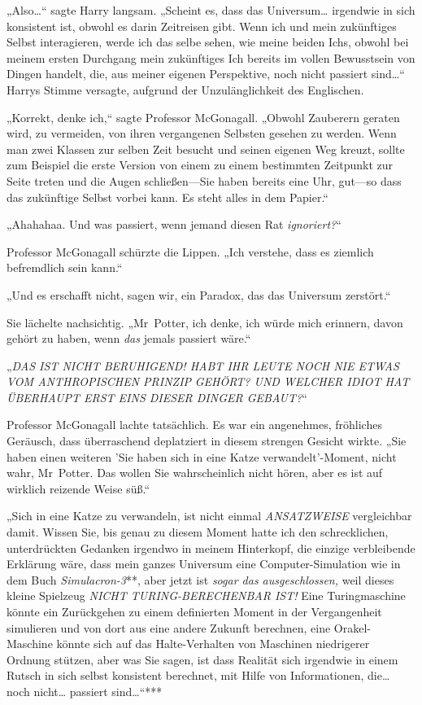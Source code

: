 {„Also…“ sagte Harry langsam. „Scheint es, dass das Universum… irgendwie in sich konsistent ist, obwohl es darin Zeitreisen gibt. Wenn ich und mein zukünftiges Selbst interagieren, werde ich das selbe sehen, wie meine beiden Ichs, obwohl bei meinem ersten Durchgang mein zukünftiges Ich bereits im vollen Bewusstsein von Dingen handelt, die, aus meiner eigenen Perspektive, noch nicht passiert sind…“ Harrys Stimme versagte, aufgrund der Unzulänglichkeit des Englischen.

„Korrekt, denke ich,“ sagte Professor McGonagall. „Obwohl Zauberern geraten wird, zu vermeiden, von ihren vergangenen Selbsten gesehen zu werden. Wenn man zwei Klassen zur selben Zeit besucht und seinen eigenen Weg kreuzt, sollte zum Beispiel die erste Version von einem zu einem bestimmten Zeitpunkt zur Seite treten und die Augen schließen—Sie haben bereits eine Uhr, gut—so dass das zukünftige Selbst vorbei kann. Es steht alles in dem Papier.“

„Ahahahaa. Und was passiert, wenn jemand diesen Rat \emph{ignoriert?}“

Professor McGonagall schürzte die Lippen. „Ich verstehe, dass es ziemlich befremdlich sein kann.“

„Und es erschafft nicht, sagen wir, ein Paradox, das das Universum zerstört.“

Sie lächelte nachsichtig. „Mr~Potter, ich denke, ich würde mich erinnern, davon gehört zu haben, wenn \emph{das} jemals passiert wäre.“

„\emph{DAS IST NICHT BERUHIGEND! HABT IHR LEUTE NOCH NIE ETWAS VOM ANTHROPISCHEN PRINZIP} \emph{GEHÖRT? UND WELCHER IDIOT HAT ÜBERHAUPT ERST EINS DIESER DINGER GEBAUT?}“

Professor McGonagall lachte tatsächlich. Es war ein angenehmes, fröhliches Geräusch, dass überraschend deplatziert in diesem strengen Gesicht wirkte. „Sie haben einen weiteren 'Sie haben sich in eine Katze verwandelt'-Moment, nicht wahr, Mr~Potter. Das wollen Sie wahrscheinlich nicht hören, aber es ist auf wirklich reizende Weise süß.“

„Sich in eine Katze zu verwandeln, ist nicht einmal \emph{ANSATZWEISE} vergleichbar damit. Wissen Sie, bis genau zu diesem Moment hatte ich den schrecklichen, unterdrückten Gedanken irgendwo in meinem Hinterkopf, die einzige verbleibende Erklärung wäre, dass mein ganzes Universum eine Computer-Simulation wie in dem Buch \emph{Simulacron-3}**, aber jetzt ist \emph{sogar das ausgeschlossen,} weil dieses kleine Spielzeug \emph{NICHT TURING-BERECHENBAR IST!} Eine Turingmaschine könnte ein Zurückgehen zu einem definierten Moment in der Vergangenheit simulieren und von dort aus eine andere Zukunft berechnen, eine Orakel-Maschine könnte sich auf das Halte-Verhalten von Maschinen niedrigerer Ordnung stützen, aber was Sie sagen, ist dass Realität sich irgendwie in einem Rutsch in sich selbst konsistent berechnet, mit Hilfe von Informationen, die… noch nicht… passiert sind…“***

}
